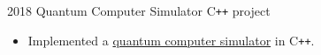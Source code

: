     
\cventry
  {2018}
  {Quantum Computer Simulator}
  {C\texttt{++} project}
  {}
  {}
  {
    \begin{itemize}
      \item Implemented a \href{https://github.com/jtiosue/Quantum-Computer-Simulator-with-Algorithms}{quantum computer simulator} in C\texttt{++}.
    \end{itemize}
  }



    
